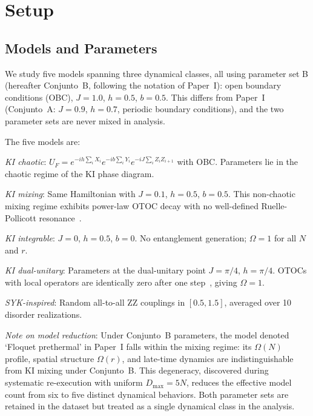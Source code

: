 \documentclass[twocolumn,showpacs,preprintnumbers,amsmath,amssymb,aps,prl]{revtex4-2}
\begin{document}
\section{Setup}

\subsection{Models and Parameters}

We study five models spanning three dynamical classes, all using parameter set B
(hereafter Conjunto~B, following the notation of Paper~I): open boundary conditions (OBC), $J = 1.0$, $h = 0.5$, $b = 0.5$.
This differs from Paper~I~\cite{PerezEugenio2026a} (Conjunto~A: $J = 0.9$,
$h = 0.7$, periodic boundary conditions), and the two parameter sets are never
mixed in analysis.

The five models are:

\textit{KI chaotic}: $U_F = e^{-ih\sum_i X_i} e^{-ib\sum_i Y_i}
e^{-iJ\sum_i Z_i Z_{i+1}}$ with OBC. Parameters lie in the chaotic regime of the
KI phase diagram.

\textit{KI mixing}: Same Hamiltonian with $J = 0.1$, $h = 0.5$, $b = 0.5$. This
non-chaotic mixing regime exhibits power-law OTOC decay with no well-defined
Ruelle-Pollicott resonance~\cite{Znidaric2024,GarciaMata2026}.

\textit{KI integrable}: $J = 0$, $h = 0.5$, $b = 0$. No entanglement generation;
$\Omega = 1$ for all $N$ and $r$.

\textit{KI dual-unitary}: Parameters at the dual-unitary point $J = \pi/4$,
$h = \pi/4$. OTOCs with local operators are identically zero after one
step~\cite{BertiniKosProsen2019}, giving $\Omega = 1$.

\textit{SYK-inspired}: Random all-to-all ZZ couplings in $[0.5, 1.5]$, averaged
over 10 disorder realizations.

\textit{Note on model reduction}: Under Conjunto~B parameters, the model denoted
`Floquet prethermal' in Paper~I falls within the mixing regime: its $\Omega(N)$
profile, spatial structure $\Omega(r)$, and late-time dynamics are
indistinguishable from KI mixing under Conjunto~B. This degeneracy, discovered
during systematic re-execution with uniform $D_{\max} = 5N$, reduces the
effective model count from six to five distinct dynamical behaviors. Both
parameter sets are retained in the dataset but treated as a single dynamical
class in the analysis.
\end{document}
